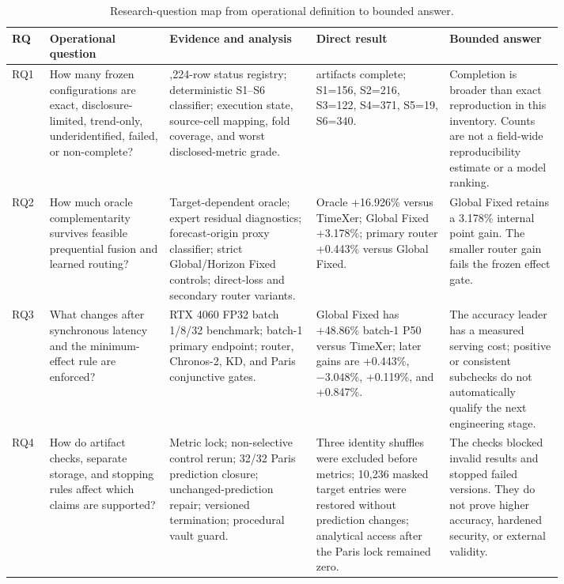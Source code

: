 \begin{table}[htbp]
\centering
\caption{Research-question map from operational definition to bounded answer.}
\label{tab:rq-map}
\scriptsize
\begin{tabular}{>{\raggedright\arraybackslash}p{0.04\linewidth}>{\raggedright\arraybackslash}p{0.18\linewidth}>{\raggedright\arraybackslash}p{0.22\linewidth}>{\raggedright\arraybackslash}p{0.20\linewidth}>{\raggedright\arraybackslash}p{0.17\linewidth}}
\toprule
RQ & Operational question & Evidence and analysis & Direct result & Bounded answer \\
\midrule
RQ1 & How many frozen configurations are exact, disclosure-limited, trend-only, underidentified, failed, or non-complete? & 1,224-row status registry; deterministic S1--S6 classifier; execution state, source-cell mapping, fold coverage, and worst disclosed-metric grade. & 865 artifacts complete; S1=156, S2=216, S3=122, S4=371, S5=19, S6=340. & Completion is broader than exact reproduction in this inventory.  Counts are not a field-wide reproducibility estimate or a model ranking. \\
RQ2 & How much oracle complementarity survives feasible prequential fusion and learned routing? & Target-dependent oracle; expert residual diagnostics; forecast-origin proxy classifier; strict Global/Horizon Fixed controls; direct-loss and secondary router variants. & Oracle +16.926\% versus TimeXer; Global Fixed +3.178\%; primary router +0.443\% versus Global Fixed. & Global Fixed retains a 3.178\% internal point gain.  The smaller router gain fails the frozen effect gate. \\
RQ3 & What changes after synchronous latency and the minimum-effect rule are enforced? & RTX 4060 FP32 batch 1/8/32 benchmark; batch-1 primary endpoint; router, Chronos-2, KD, and Paris conjunctive gates. & Global Fixed has +48.86\% batch-1 P50 versus TimeXer; later gains are +0.443\%, $-3.048\%$, +0.119\%, and +0.847\%. & The accuracy leader has a measured serving cost; positive or consistent subchecks do not automatically qualify the next engineering stage. \\
RQ4 & How do artifact checks, separate storage, and stopping rules affect which claims are supported? & Metric lock; non-selective control rerun; 32/32 Paris prediction closure; unchanged-prediction repair; versioned termination; procedural vault guard. & Three identity shuffles were excluded before metrics; 10,236 masked target entries were restored without prediction changes; analytical access after the Paris lock remained zero. & The checks blocked invalid results and stopped failed versions.  They do not prove higher accuracy, hardened security, or external validity. \\
\bottomrule
\end{tabular}
\end{table}
